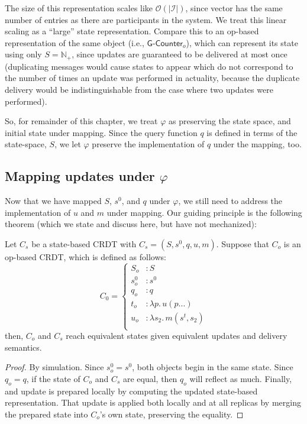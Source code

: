 The size of this representation scales like $\mathcal{O}(|\mathcal{I}|)$, since
vector has the same number of entries as there are participants in the system.
We treat this linear scaling as a ``large'' state representation. Compare this
to an op-based representation of the same object (i.e., $\textsf{G-Counter}_o$),
which can represent its state using only $S = \mathbb{N}_+$, since updates are
guaranteed to be delivered at most once (duplicating messages would cause states
to appear which do not correspond to the number of times an update was performed
in actuality, because the duplicate delivery would be indistinguishable from the
case where two updates were performed).

So, for remainder of this chapter, we treat $\varphi$ as preserving the state
space, and initial state under mapping. Since the query function $q$ is defined
in terms of the state-space, $S$, we let $\varphi$ preserve the implementation of
$q$ under the mapping, too.

\subsection{Mapping updates under $\varphi$}
Now that we have mapped $S$, $s^0$, and $q$ under $\varphi$, we still need to
address the implementation of $u$ and $m$ under mapping. Our guiding principle
is the following theorem (which we state and discuss here, but have not
mechanized):
\begin{theorem}
  Let $C_s$ be a state-based CRDT with $C_s = (S, s^0, q, u, m)$. Suppose that
  $C_o$ is an op-based CRDT, which is defined as follows:
  \[
    C_0 = \left\{ \begin{aligned}
      S_o &: S \\
      s^0_o &: s^0 \\
      q_o &: q \\
      t_o &: \lambda p.\, u(p...) \\
      u_o &: \lambda s_2.\, m(s^t, s_2) \\
    \end{aligned} \right.
  \]
  then, $C_o$ and $C_s$ reach equivalent states given equivalent updates and
  delivery semantics.
\end{theorem}
\begin{proof}
By simulation. Since $s^0_o = s^0$, both objects begin in the same state. Since
$q_o = q$, if the state of $C_o$ and $C_s$ are equal, then $q_o$ will reflect as
much. Finally, and update is prepared locally by computing the updated
state-based representation. That update is applied both locally and at all
replicas by merging the prepared state into $C_o$'s own state, preserving the
equality.
\end{proof}

